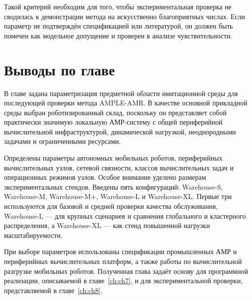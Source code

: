 Такой критерий необходим для того, чтобы экспериментальная проверка не сводилась к демонстрации метода на искусственно благоприятных числах. Если параметр не подтверждён спецификацией или литературой, он должен быть помечен как модельное допущение и проверен в анализе чувствительности.

\section{Выводы по главе}

В главе задана параметризация предметной области имитационной среды для последующей проверки метода AMPLE-AMR. В качестве основной прикладной среды выбран роботизированный склад, поскольку он представляет собой практически значимую локальную АМР-систему с общей периферийной вычислительной инфраструктурой, динамической нагрузкой, неоднородными задачами и ограниченными ресурсами.

Определены параметры автономных мобильных роботов, периферийных вычислительных узлов, сетевой связности, классов вычислительных задач и операционных режимов узлов. Особое внимание уделено размерам экспериментальных стендов. Введены пять конфигураций: Warehouse-S, Warehouse-M, Warehouse-M+, Warehouse-L и Warehouse-XL. Первые три используются для базовой и средней проверки качества обслуживания, Warehouse-L --- для крупных сценариев и сравнения глобального и кластерного распределения, а Warehouse-XL --- как стенд повышенной нагрузки масштабируемости.

При выборе параметров использованы спецификации промышленных АМР и периферийных вычислительных платформ, а также работы по вычислительной разгрузке мобильных роботов. Полученная глава задаёт основу для программной реализации, описываемой в главе~\ref{ch:ch7}, и для экспериментальной проверки, представляемой в главе~\ref{ch:ch8}.
